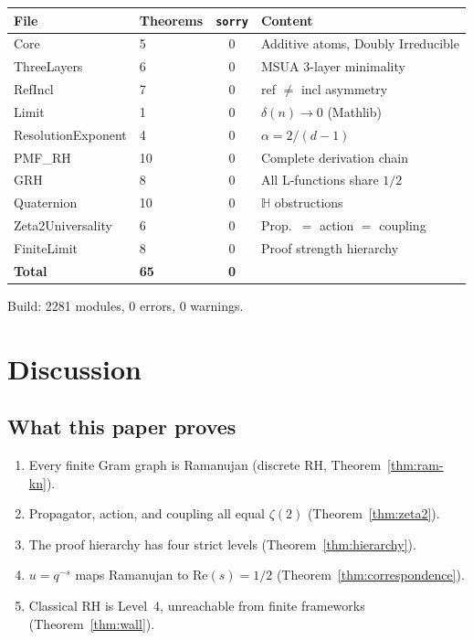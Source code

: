\documentclass[12pt]{article}
\theoremstyle{definition}
\theoremstyle{remark}
\begin{document}
\begin{center}
\begin{tabular}{llcl}
\toprule
File & Theorems & \texttt{sorry} & Content \\
\midrule
Core & 5 & 0 & Additive atoms, Doubly Irreducible \\
ThreeLayers & 6 & 0 & MSUA 3-layer minimality \\
RefIncl & 7 & 0 & ref $\neq$ incl asymmetry \\
Limit & 1 & 0 & $\delta(n) \to 0$ (Mathlib) \\
ResolutionExponent & 4 & 0 & $\alpha = 2/(d-1)$ \\
PMF\_RH & 10 & 0 & Complete derivation chain \\
GRH & 8 & 0 & All L-functions share $1/2$ \\
Quaternion & 10 & 0 & $\mathbb{H}$ obstructions \\
Zeta2Universality & 6 & 0 & Prop.\ $=$ action $=$ coupling \\
FiniteLimit & 8 & 0 & Proof strength hierarchy \\
\midrule
\textbf{Total} & \textbf{65} & \textbf{0} & \\
\bottomrule
\end{tabular}
\end{center}

Build: 2281 modules, 0 errors, 0 warnings.

\section{Discussion}
\label{sec:disc}

\subsection{What this paper proves}

\begin{enumerate}
\item Every finite Gram graph is Ramanujan
  (discrete RH, Theorem~\ref{thm:ram-kn}).
\item Propagator, action, and coupling all equal $\zeta(2)$
  (Theorem~\ref{thm:zeta2}).
\item The proof hierarchy has four strict levels
  (Theorem~\ref{thm:hierarchy}).
\item $u = q^{-s}$ maps Ramanujan to $\mathrm{Re}(s) = 1/2$
  (Theorem~\ref{thm:correspondence}).
\item Classical RH is Level~4, unreachable from finite frameworks
  (Theorem~\ref{thm:wall}).
\end{enumerate}
\end{document}
